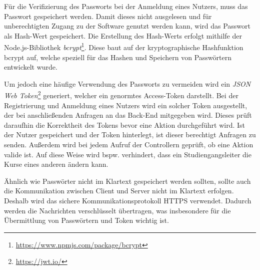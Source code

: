 Für die Verifizierung des Passworts bei der Anmeldung eines Nutzers, muss das Passwort gespeichert werden.
Damit dieses nicht ausgelesen und für unberechtigten Zugang zu der Software genutzt werden kann, wird das Passwort als Hash-Wert gespeichert.
Die Erstellung des Hash-Werts erfolgt mithilfe der Node.js-Bibliothek \textit{bcrypt}\footnote{\url{https://www.npmjs.com/package/bcrypt}}.
Diese baut auf der kryptographische Hashfunktion bcrypt auf, welche speziell für das Hashen und Speichern von Passwörtern entwickelt wurde.

Um jedoch eine häufige Verwendung des Passworts zu vermeiden wird ein \textit{JSON Web Token}\footnote{\url{https://jwt.io/}} generiert, welcher ein genormtes Access-Token darstellt.
Bei der Registrierung und Anmeldung eines Nutzers wird ein solcher Token ausgestellt, der bei anschließenden Anfragen an das Back-End mitgegeben wird.
Dieses prüft daraufhin die Korrektheit des Tokens bevor eine Aktion durchgeführt wird.
Ist der Nutzer gespeichert und der Token hinterlegt, ist dieser berechtigt Anfragen zu senden.
Außerdem wird bei jedem Aufruf der Controllern geprüft, ob eine Aktion valide ist.
Auf diese Weise wird bspw. verhindert, dass ein Studiengangsleiter die Kurse eines anderen ändern kann. 

Ähnlich wie Passwörter nicht im Klartext gespeichert werden sollten, sollte auch die Kommunikation zwischen Client und Server nicht im Klartext erfolgen.
Deshalb wird das sichere Kommunikationsprotokoll \acs{HTTPS} verwendet.
Dadurch werden die Nachrichten verschlüsselt übertragen, was insbesondere für die Übermittlung von Passwörtern und Token wichtig ist. 